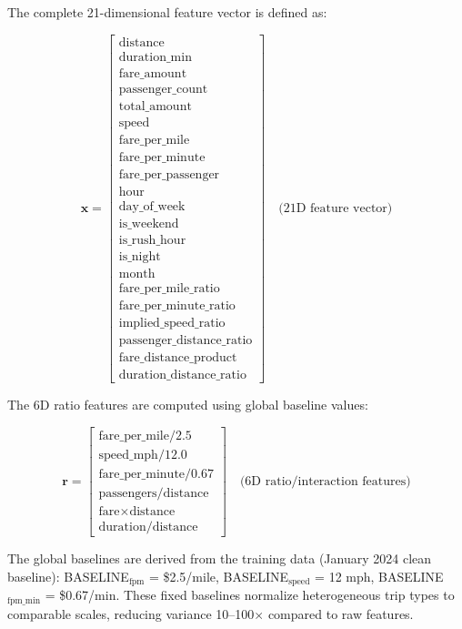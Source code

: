The complete 21-dimensional feature vector is defined as:

\begin{equation}
\mathbf{x} = \begin{bmatrix}
\text{distance} \\
\text{duration\_min} \\
\text{fare\_amount} \\
\text{passenger\_count} \\
\text{total\_amount} \\
\text{speed} \\
\text{fare\_per\_mile} \\
\text{fare\_per\_minute} \\
\text{fare\_per\_passenger} \\
\text{hour} \\
\text{day\_of\_week} \\
\text{is\_weekend} \\
\text{is\_rush\_hour} \\
\text{is\_night} \\
\text{month} \\
\text{fare\_per\_mile\_ratio} \\
\text{fare\_per\_minute\_ratio} \\
\text{implied\_speed\_ratio} \\
\text{passenger\_distance\_ratio} \\
\text{fare\_distance\_product} \\
\text{duration\_distance\_ratio}
\end{bmatrix} \quad \text{(21D feature vector)}
\end{equation}

The 6D ratio features are computed using global baseline values:

\begin{equation}
\mathbf{r} = \begin{bmatrix}
\text{fare\_per\_mile} / 2.5 \\
\text{speed\_mph} / 12.0 \\
\text{fare\_per\_minute} / 0.67 \\
\text{passengers} / \text{distance} \\
\text{fare} \times \text{distance} \\
\text{duration} / \text{distance}
\end{bmatrix} \quad \text{(6D ratio/interaction features)}
\end{equation}

The global baselines are derived from the training data (January 2024 clean baseline): BASELINE$_{\text{fpm}}$ = \$2.5/mile, BASELINE$_{\text{speed}}$ = 12 mph, BASELINE$_{\text{fpm\_min}}$ = \$0.67/min. These fixed baselines normalize heterogeneous trip types to comparable scales, reducing variance 10--100$\times$ compared to raw features.

